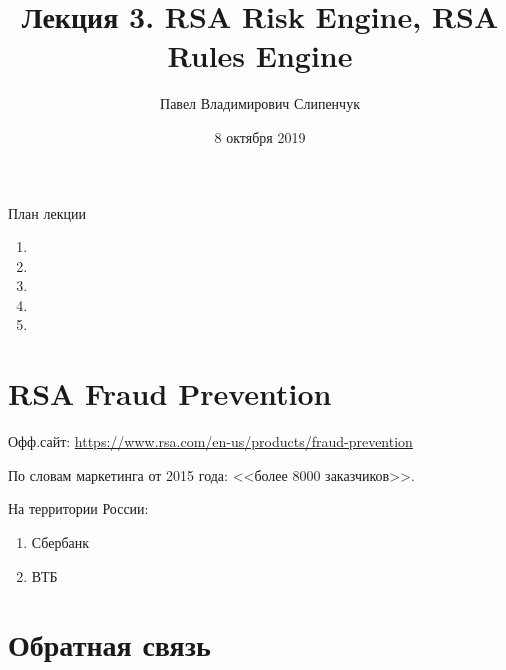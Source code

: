 


\title{Лекция 3. RSA Risk Engine, RSA Rules Engine}
\date{8 октября 2019}
\author{Павел Владимирович Слипенчук}


  \maketitle
    
\begin{frame}{План лекции}
    \begin{enumerate}
    	\item {}
		\item {}
		\item {}
		\item {}
		\item {}
	\end{enumerate}
\end{frame}

\section{RSA Fraud Prevention}\label{section:rsa_fp}

\begin{frame}
	Офф.сайт: \url{https://www.rsa.com/en-us/products/fraud-prevention}
	
	По словам маркетинга от 2015 года: <<более 8000 заказчиков>>.
	
	На территории России:
	\begin{enumerate}
		\item Сбербанк
		\item ВТБ
	\end{enumerate}
	
\end{frame}


\section{Обратная связь}\label{section:feedback}

